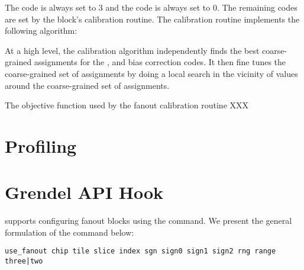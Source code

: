 The  code is always set to $3$ and the  code is always set to
$0$. The remaining codes are set by the block's calibration routine. The calibration routine implements the following algorithm:

\begin{algorithmic}
  \EndFor
  \EndFor
  \EndFor
  \EndFor
  \EndFor
  \EndFor
\end{algorithmic}

At a high level, the calibration algorithm independently finds the best
coarse-grained assignments for the , 
and  bias correction codes. It then fine tunes the
coarse-grained set of assignments by doing a local search in the vicinity of values
around the coarse-grained set of assignments. 

The objective function used by the fanout calibration routine  XXX


\section{Profiling}\label{fanout:calib}


\section{Grendel API Hook}

\grendel supports configuring fanout blocks using the  command.
We present the general formulation of the  command below:

\begin{lstlisting}
use_fanout chip tile slice index sgn sign0 sign1 sign2 rng range three|two
\end{lstlisting}

